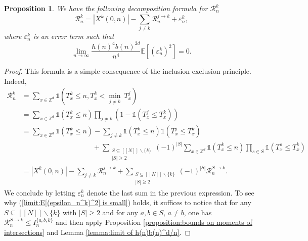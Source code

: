 \documentclass[10pt,a4paper]{amsart}
\newcommand{\R}{\mathcal R}
\newcommand{\EE}{\mathbb E}
\newcommand{\1}{\mathds{1}}
\newcommand{\ZZ}{\mathbb Z}
\newtheorem{proposition}{Proposition}
\numberwithin{equation}{section}
\begin{document}
\begin{proposition}
\label{proposition:decomposition formula for mathcal R_n^k}
    We have the following decomposition formula for $\R_n^k$
    \begin{equation}
    \label{eq:decomposition formula for R_n^k}
        \R_n^k=\left|X^k(0,n)\right|-\sum_{j\ne k}\R_n^{j\rightarrow k}+\varepsilon_n^k,
    \end{equation}
    where $\varepsilon_n^k$ is an error term such that 
    \begin{equation}
        \label{limit:E[(epsilon_n^k)^2] is small}
        \lim_{n\rightarrow\infty}\frac{h(n)^4b(n)^{2d}}{n^4}\EE\left[\left(\varepsilon_{n}^k\right)^2\right]=0.
    \end{equation}
\end{proposition}

\begin{proof}
    This formula is a simple consequence of the inclusion-exclusion principle. Indeed,
    \begin{align*}
        \R_n^k&=\sum_{x\in\ZZ^d}\1\left(T_x^k\le n,T_x^k<\underset{j\ne k}\min\  T_x^j\right)\\
        &=\sum_{x\in\ZZ^d}\1\left(T_x^k\le n\right)\prod_{j\ne k}\left(1-\1\left(T_x^j\le T_x^k\right)\right)\\
        &=\sum_{x\in\ZZ^d}\1\left(T_x^k\le n\right)-\sum_{j\ne k}\1\left(T_x^k\le n\right)\1\left(T_x^j\le T_x^k\right)\\
        &\hspace{10em}+\sum_{\substack{S\subseteq[\![N]\!]\backslash\{k\} \\ |S|\ge2}}(-1)^{|S|}\sum_{x\in\ZZ^d}\1\left(T_x^k\le n\right)\prod_{s\in S}\1\left(T_x^s\le T_x^k\right)\\
        &=\left|X^k(0,n)\right|-\sum_{j\ne k}\R_n^{j\rightarrow k}+\sum_{\substack{S\subseteq[\![N]\!]\backslash\{k\} \\ |S|\ge2}}(-1)^{|S|}\R_n^{S\rightarrow k}.
    \end{align*}
    We conclude by letting $\varepsilon_n^k$ denote the last sum in the previous expression. To see why (\ref{limit:E[(epsilon_n^k)^2] is small}) holds, it suffices to notice that for any $S\subseteq[\![N]\!]\backslash\{k\}$ with $|S|\ge2$ and for any $a,b\in S$, $a\ne b$, one has $\R_n^{S\rightarrow k}\le I_n^{\{a,b,k\}}$ and then apply Proposition \ref{proposition:bounds on moments of intersections} and Lemma \ref{lemma:limit of h(n)b(n)^d/n}.
\end{proof}
\end{document}
